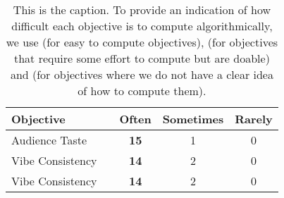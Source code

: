 
\begin{table}[htb!]
    \centering
    \caption{This is the caption. To provide an indication of how difficult each objective is to compute algorithmically, we use \easy{} (for easy to compute objectives), \medium{} (for objectives that require some effort to compute but are doable) and \hard{} (for objectives where we do not have a clear idea of how to compute them).}
    \label{tab:my_table}
    \begin{tabular}{lcccc}
        \toprule
        \textbf{Objective} && \textbf{Often} & \textbf{Sometimes} & \textbf{Rarely} \\
        \midrule
        \listenermarker{} Audience Taste & \hard{} & \cellcolor{lightgray}\textbf{15} & 1 & 0 \\
        \listenermarker{} Vibe Consistency & \medium{} & \cellcolor{lightgray}\textbf{14} & 2 & 0 \\
        \listenermarker{} Vibe Consistency & \easy{} & \cellcolor{lightgray}\textbf{14} & 2 & 0 \\

        \bottomrule
    \end{tabular}
\end{table}
